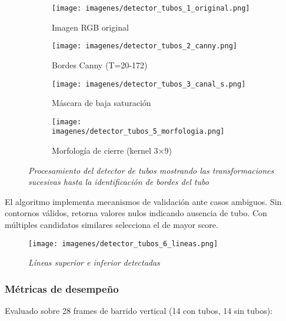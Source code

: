 \begin{figure}[H]
\centering
\begin{subfigure}[b]{0.48\textwidth}
    \centering
    \texttt{[image: imagenes/detector\_tubos\_1\_original.png]}
    \caption{Imagen RGB original}
\end{subfigure}
\hfill
\begin{subfigure}[b]{0.48\textwidth}
    \centering
    \texttt{[image: imagenes/detector\_tubos\_2\_canny.png]}
    \caption{Bordes Canny (T=20-172)}
\end{subfigure}

\vspace{0.3cm}

\begin{subfigure}[b]{0.48\textwidth}
    \centering
    \texttt{[image: imagenes/detector\_tubos\_3\_canal\_s.png]}
    \caption{Máscara de baja saturación}
\end{subfigure}
\hfill
\begin{subfigure}[b]{0.48\textwidth}
    \centering
    \texttt{[image: imagenes/detector\_tubos\_5\_morfologia.png]}
    \caption{Morfología de cierre (kernel 3×9)}
\end{subfigure}

\vspace{0.3cm}

\caption{\textit{Procesamiento del detector de tubos mostrando las transformaciones sucesivas hasta la identificación de bordes del tubo}}
\label{fig:proceso_tubos}
\end{figure}

El algoritmo implementa mecanismos de validación ante casos ambiguos. Sin contornos válidos, retorna valores nulos indicando ausencia de tubo. Con múltiples candidatos similares selecciona el de mayor score. 

\begin{figure}[H]
    \centering
    \texttt{[image: imagenes/detector\_tubos\_6\_lineas.png]}
    \caption{\textit{Líneas superior e inferior detectadas}}
    \label{fig:detector_tubos_lineas}
\end{figure}

\subsubsection{Métricas de desempeño}
Evaluado sobre 28 frames de barrido vertical (14 con tubos, 14 sin tubos):

